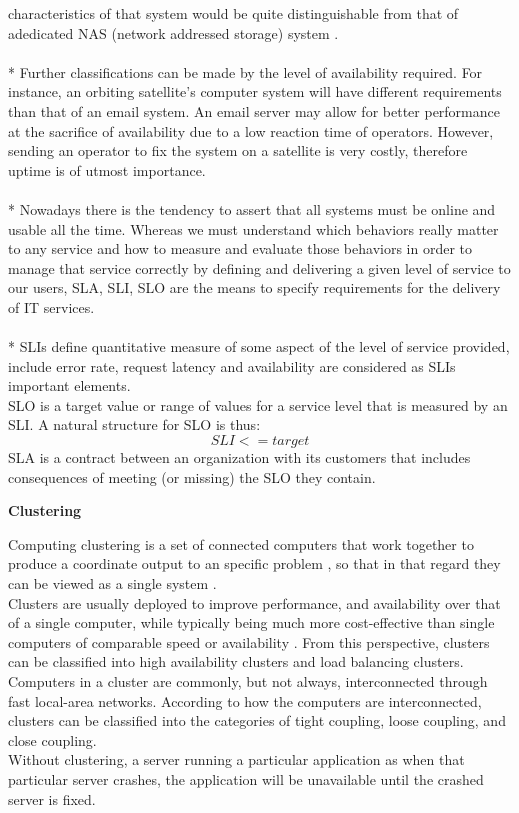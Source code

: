 \documentclass[english]{tktltiki2}
\theoremstyle{definition}
\theoremstyle{remark}
\begin{document}
characteristics of that system would be quite distinguishable from that of adedicated NAS (network addressed storage) system \cite{4795877}.\\ \\*
Further classifications can be made by the level of availability required. For instance, an orbiting satellite’s computer system will have different requirements than that of an email system. An email server may allow for better performance at the sacrifice of availability due to a low reaction time of operators. However, sending an operator to fix the system on a satellite is very costly, therefore uptime is of utmost importance.\\ \\*
Nowadays there is the tendency to assert that all systems must be online and usable all the time. Whereas we must  understand which behaviors really matter to any service and how to measure and evaluate those behaviors in order to manage that service correctly by defining and delivering a given level of service to our users, SLA, SLI, SLO \cite{SRE} are the means to specify requirements for the delivery of IT services.\\ \\* 
SLIs define quantitative measure of some aspect of the level of service provided, include error rate, request latency and availability  are considered as  SLIs important elements.\\
SLO is a target value or range of values for a service level that is measured by an SLI. A natural structure for SLO is thus:
\begin{equation}
SLI <= target
\end{equation}
SLA is a contract between an organization with its customers that includes consequences of meeting (or missing) the SLO they contain.

\begin{flushleft}
\textbf{Clustering}
\end{flushleft}
Computing clustering is a set of connected computers that work together to produce a coordinate output to an specific problem , so that in that  regard they can be viewed as a single system \cite{20190}.\\ 
Clusters are usually deployed to improve performance, and availability over that of a single computer, while typically being much more cost-effective than single computers of comparable speed or availability \cite{20191}.
From this perspective, clusters can be classified into high availability clusters and load balancing clusters.\\
Computers in a cluster are commonly, but not always, interconnected
through fast local-area networks. According to how the computers are interconnected, clusters can be classified into the categories of tight coupling, loose coupling, and close coupling.\\
Without clustering, a server running a particular application as when that particular server crashes, the application will be unavailable until the crashed server is fixed. 
\end{document}

